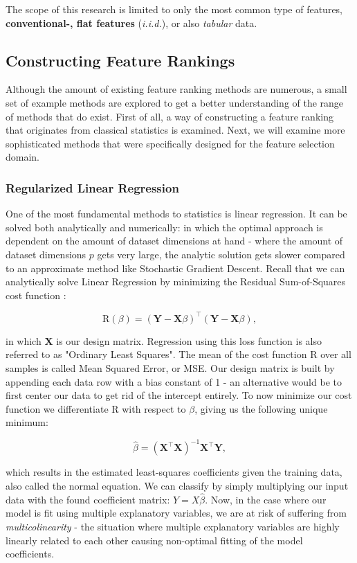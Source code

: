 \documentclass{article}
\begin{document}
The scope of this research is limited to only the most common type of features, \textbf{conventional-, flat features} (\textit{i.i.d.}), or also \textit{tabular} data.

\subsection{Constructing Feature Rankings}
Although the amount of existing feature ranking methods are numerous, a small set of example methods are explored to get a better understanding of the range of methods that do exist. First of all, a way of constructing a feature ranking that originates from classical statistics is examined. Next, we will examine more sophisticated methods that were specifically designed for the feature selection domain.

\subsubsection{Regularized Linear Regression}
One of the most fundamental methods to statistics is linear regression. It can be solved both analytically and numerically: in which the optimal approach is dependent on the amount of dataset dimensions at hand - where the amount of dataset dimensions $p$ gets very large, the analytic solution gets slower compared to an approximate method like Stochastic Gradient Descent. Recall that we can analytically solve Linear Regression by minimizing the Residual Sum-of-Squares cost function \citep{hastie_elements_2009}:

$$\text{R}(\beta) = (\mathbf{Y} - \mathbf{X} \beta)^\intercal (\mathbf{Y} - \mathbf{X} \beta),$$

in which $\mathbf{X}$ is our design matrix. Regression using this loss function is also referred to as "Ordinary Least Squares". The mean of the cost function $\text{R}$ over all samples is called Mean Squared Error, or MSE. Our design matrix is built by appending each data row with a bias constant of 1 - an alternative would be to first center our data to get rid of the intercept entirely. To now minimize our cost function we differentiate $\text{R}$ with respect to $\beta$, giving us the following unique minimum:

$$\hat{\beta} = (\mathbf{X}^\intercal \mathbf{X})^{-1} \mathbf{X}^\intercal \mathbf{Y},$$

which results in the estimated least-squares coefficients given the training data, also called the normal equation. We can classify by simply multiplying our input data with the found coefficient matrix: $\hat{Y} = X \hat{\beta}$. Now, in the case where our model is fit using multiple explanatory variables, we are at risk of suffering from \textit{multicolinearity} - the situation where multiple explanatory variables are highly linearly related to each other causing non-optimal fitting of the model coefficients.
\end{document}
